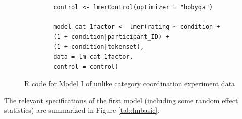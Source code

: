 \begin{figure}[!h]
	\begin{lstlisting}
		control <- lmerControl(optimizer = "bobyqa")
		
		model_cat_1factor <- lmer(rating ~ condition +
		(1 + condition|participant_ID) +
		(1 + condition|tokenset),
		data = lm_cat_1factor,
		control = control)\end{lstlisting}
	\caption{R code for Model I of unlike category coordination experiment data}
	\label{fig:R_catmodelbasic}
\end{figure}


The relevant specifications of the first model (including some random effect statistics) are summarized in Figure \ref{tab:lmbasic}. 


